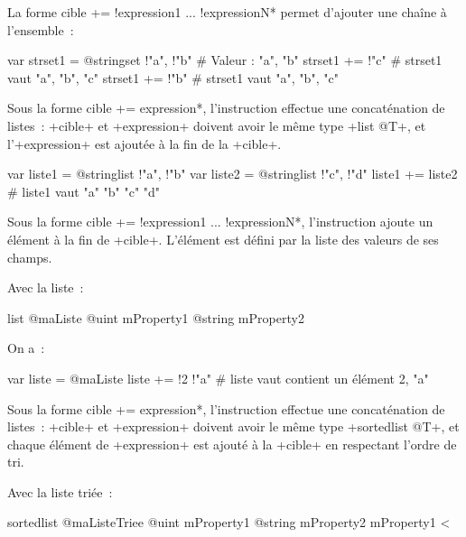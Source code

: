 La forme \ggs*cible += !expression1 ... !expressionN* permet d'ajouter une chaîne à l'ensemble~:
\begin{galgas}
var strset1 = @stringset {!"a", !"b"} # Valeur : "a", "b"
strset1 += !"c" # strset1 vaut "a", "b", "c"
strset1 += !"b" # strset1 vaut "a", "b", "c"
\end{galgas}




Sous la forme \ggs*cible += expression*, l'instruction effectue une concaténation de listes~: \ggs+cible+ et \ggs+expression+ doivent avoir le même type \ggs+list @T+, et l'\ggs+expression+ est ajoutée à la fin de la \ggs+cible+.

\begin{galgas}
var liste1 = @stringlist {!"a", !"b"}
var liste2 = @stringlist {!"c", !"d"}
liste1 += liste2 # liste1 vaut "a" "b" "c" "d"
\end{galgas}



Sous la forme \ggs*cible += !expression1 ... !expressionN*, l'instruction ajoute un élément à la fin de \ggs+cible+. L'élément est défini par la liste des valeurs de ses champs.

Avec la liste~:
\begin{galgas}
list @maListe {
  @uint mProperty1
  @string mProperty2
}
\end{galgas}

On a~:

\begin{galgas}
var liste = @maListe {}
liste += !2 !"a" # liste vaut contient un élément 2, "a"
\end{galgas}







Sous la forme \ggs*cible += expression*, l'instruction effectue une concaténation de listes~: \ggs+cible+ et \ggs+expression+ doivent avoir le même type \ggs+sortedlist @T+, et chaque élément de \ggs+expression+ est ajouté à la \ggs+cible+ en respectant l'ordre de tri.

Avec la liste triée~:
\begin{galgas}
sortedlist @maListeTriee {
  @uint mProperty1
  @string mProperty2
}{
  mProperty1 <
}
\end{galgas}

